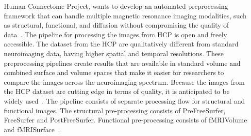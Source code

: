 
Human Connectome Project, wants to develop an automated preprocessing framework that can handle multiple magnetic resonance imaging modalities, such as structural, functional, and diffusion without compromising the quality of data~\cite{Gla13}. The pipeline for processing the images from HCP is open and freely accessible. The dataset from the HCP are qualitatively different from standard neuroimaging data, having higher spatial and temporal resolutions. These preprocessing pipelines create results that are available in standard volume and combined surface and volume spaces that make it easier for researchers to compare the images across the neuroimaging spectrum. Because the images from the HCP dataset are cutting edge in terms of quality, it is anticipated to be widely used~\cite{HODGE20161102}. The pipeline consists of separate processing flow for structural and functional images. The structural pre-processing consists of PreFreeSurfer, FreeSurfer and PostFreeSurfer. Functional pre-processing consists of fMRIVolume and fMRISurface~\cite{FSL}.

